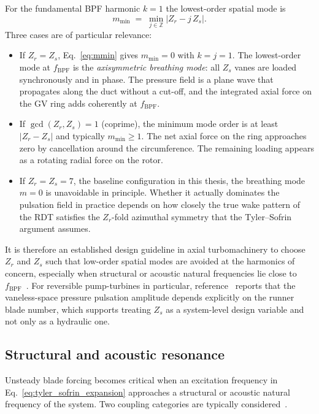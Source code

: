 For the fundamental BPF harmonic $k=1$ the lowest-order spatial mode
is
\begin{equation}
    m_{\min} \;=\; \min_{j\in\mathbb{Z}} \bigl| Z_r - j\,Z_s \bigr|.
    \label{eq:mmin}
\end{equation}
Three cases are of particular relevance:
\begin{itemize}
  \item If $Z_r = Z_s$, Eq.~\eqref{eq:mmin} gives $m_{\min}=0$ with
        $k=j=1$. The lowest-order mode at $f_{\mathrm{BPF}}$ is the
        \emph{axisymmetric breathing mode}: all $Z_s$ vanes are
        loaded synchronously and in phase. The pressure field is a
        plane wave that propagates along the duct without a cut-off,
        and the integrated axial force on the GV ring adds
        coherently at $f_{\mathrm{BPF}}$.
  \item If $\gcd(Z_r,Z_s)=1$ (coprime), the minimum mode order is at
        least $|Z_r - Z_s|$ and typically $m_{\min} \geq 1$. The net
        axial force on the ring approaches zero by cancellation
        around the circumference. The remaining loading appears as a
        rotating radial force on the rotor.
  \item If $Z_r = Z_s = 7$, the baseline configuration in this
        thesis, the breathing mode $m=0$ is unavoidable in principle.
        Whether it actually dominates the pulsation field in practice
        depends on how closely the true wake pattern of the RDT
        satisfies the $Z_r$-fold azimuthal symmetry that the
        Tyler--Sofrin argument assumes.
\end{itemize}
It is therefore an established design guideline in axial
turbomachinery to choose $Z_r$ and $Z_s$ such that low-order spatial
modes are avoided at the harmonics of concern, especially when
structural or acoustic natural frequencies lie close to
$f_{\mathrm{BPF}}$~\cite{Brekke2015,Egusquiza2006,Tanaka2011}. For
reversible pump-turbines in particular,
reference~\cite{Nduwayezu2021} reports that the vaneless-space
pressure pulsation amplitude depends explicitly on the runner blade
number, which supports treating $Z_s$ as a system-level design
variable and not only as a hydraulic one.
 
\subsection{Structural and acoustic resonance}
\label{sec:rsi-resonance}
 
Unsteady blade forcing becomes critical when an excitation frequency
in Eq.~\eqref{eq:tyler_sofrin_expansion} approaches a structural or
acoustic natural frequency of the system. Two coupling categories
are typically considered~\cite{Egusquiza2006,Tanaka2011}.
 
